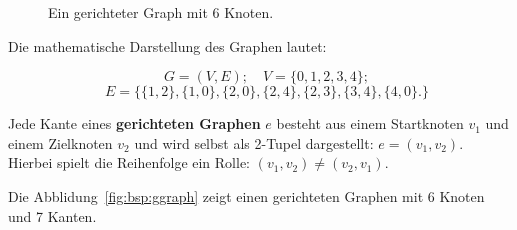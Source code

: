 \begin{figure}[htb]
\begin{center}
\caption{Ein gerichteter Graph mit 6 Knoten.
}
\label{fig:bsp:ugraph}
\end{center}
\end{figure}

Die mathematische Darstellung des Graphen lautet:

\[\quad G = (V, E); \quad V = \{0,1,2,3,4\}; \] 
\[\quad E =  \{ \{1,2\},\{1,0\},\{2,0\},\{2,4\},\{2,3\}, \{3,4\}, \{4,0\}. \}  \]

\begin{mdef}
Jede Kante eines \textbf{gerichteten Graphen} $e$ besteht aus einem Startknoten $v_1$ und einem Zielknoten $v_2$ und wird selbst als 2-Tupel dargestellt: $e= (v_1,v_2)$. 
Hierbei spielt die Reihenfolge ein Rolle: $(v_1,v_2) \neq (v_2,v_1)$. 
\end{mdef}


\begin{mbsp}
Die Abblidung~\ref{fig:bsp:ggraph} zeigt einen gerichteten Graphen mit 6 Knoten und 7 Kanten. 
\end{mbsp}

